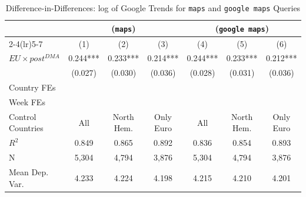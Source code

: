 \documentclass[11pt]{article}
\begin{document}
	\begin{table}[!ht]
		\centering
		\def\sym#1{\ifmmode^{#1}\else\(^{#1}\)\fi}
		\caption{\label{tab:did_trend} Difference-in-Differences: log of Google Trends for \texttt{maps} and \texttt{google maps} Queries}
		\begin{threeparttable}
			\begin{tabular}{lcccccc}
				\hline \noalign{\smallskip} 
				& \multicolumn{3}{c}{(\texttt{maps})} & \multicolumn{3}{c}{(\texttt{google maps})}  \\ \cmidrule(lr){2-4}\cmidrule(lr){5-7}
				
				&         (1)   &         (2)   &         (3)   &         (4)   &         (5)   &         (6)   \\
				\midrule
				$ EU \times post^{DMA} $ &       0.244***&       0.233***&       0.214***&       0.244***&       0.233***&       0.212***\\
				&     (0.027)   &     (0.030)   &     (0.036)   &     (0.028)   &     (0.031)   &     (0.036)   \\
				
				Country FEs         &  \checkmark   &  \checkmark   &  \checkmark   &  \checkmark   &  \checkmark   &  \checkmark   \\
				Week FEs            &  \checkmark   &  \checkmark   &  \checkmark   &  \checkmark   &  \checkmark   &  \checkmark   \\
				Control Countries   &         All   &  North Hem.   &   Only Euro   &         All   &  North Hem.   &   Only Euro   \\
				$ R ^2 $            &       0.849   &       0.865   &       0.892   &       0.836   &       0.854   &       0.893   \\
				N                   &       5,304   &       4,794   &       3,876   &       5,304   &       4,794   &       3,876   \\
				Mean Dep. Var.      &       4.233   &       4.224   &       4.198   &       4.215   &       4.210   &       4.201   \\
				\midrule
				
			\end{tabular}
			

\end{threeparttable}
\end{table}
\end{document}
